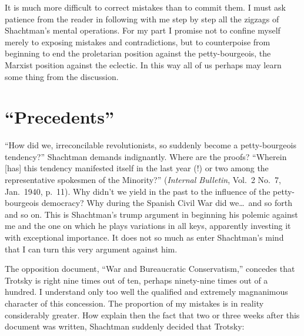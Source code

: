 It is much more difficult to correct mistakes than to commit them. I must ask patience from the reader in following with me step by step all the zigzags of Shachtman’s mental operations. For my part I promise not to confine myself merely to exposing mistakes and contradictions, but to counterpoise from beginning to end the proletarian position against the petty-bourgeois, the Marxist position against the eclectic. In this way all of us perhaps may learn some thing from the discussion.

\section*{“Precedents”}

“How did we, irreconcilable revolutionists, so suddenly become a petty-bourgeois tendency?” Shachtman demands indignantly. Where are the proofs? “Wherein [has] this tendency manifested itself in the last year (!) or two among the representative spokesmen of the Minority?” (\emph{Internal Bulletin}, Vol.~2 No.~7, Jan.~1940, p.~11). Why didn’t we yield in the past to the influence of the petty-bourgeois democracy? Why during the Spanish Civil War did we\dots\ and so forth and so on. This is Shachtman’s trump argument in beginning his polemic against me and the one on which he plays variations in all keys, apparently investing it with exceptional importance. It does not so much as enter Shachtman’s mind that I can turn this very argument against him.

The opposition document, “War and Bureaucratic Conservatism,” concedes that Trotsky is right nine times out of ten, perhaps ninety-nine times out of a hundred. I understand only too well the qualified and extremely magnanimous character of this concession. The proportion of my mistakes is in reality considerably greater. How explain then the fact that two or three weeks after this document was written, Shachtman suddenly decided that Trotsky:

\enlargethispage{-2 \baselineskip}

